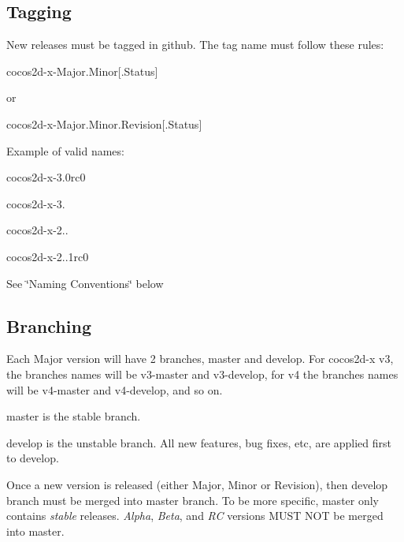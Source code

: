 \subsection*{Tagging}

New releases must be tagged in github. The tag name must follow these rules\+: \begin{DoxyVerb}cocos2d-x-Major.Minor[.Status]
\end{DoxyVerb}


or \begin{DoxyVerb}cocos2d-x-Major.Minor.Revision[.Status]
\end{DoxyVerb}


Example of valid names\+:


\begin{DoxyItemize}
\item cocos2d-\/x-\/3.\+0rc0
\item cocos2d-\/x-\/3.
\item cocos2d-\/x-\/2..
\item cocos2d-\/x-\/2..\+1rc0
\end{DoxyItemize}

See \char`\"{}\+Naming Conventions\char`\"{} below

\subsection*{Branching}

Each Major version will have 2 branches, {\ttfamily master} and {\ttfamily develop}. For cocos2d-\/x v3, the branches names will be {\ttfamily v3-\/master} and {\ttfamily v3-\/develop}, for v4 the branches names will be {\ttfamily v4-\/master} and {\ttfamily v4-\/develop}, and so on.


\begin{DoxyItemize}
\item {\ttfamily master} is the stable branch.
\item {\ttfamily develop} is the unstable branch. All new features, bug fixes, etc, are applied first to {\ttfamily develop}.
\end{DoxyItemize}

Once a new version is released (either Major, Minor or Revision), then {\ttfamily develop} branch must be merged into {\ttfamily master} branch. To be more specific, {\ttfamily master} only contains {\itshape stable} releases. {\itshape Alpha}, {\itshape Beta}, and {\itshape RC} versions M\+U\+ST N\+OT be merged into {\ttfamily master}.

